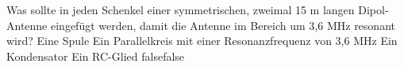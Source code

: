     {Was sollte in jeden Schenkel einer symmetrischen, zweimal 15 m langen Dipol-Antenne eingefügt werden, damit die Antenne im Bereich um 3,6 MHz resonant wird?}
    {Eine Spule}
    {Ein Parallelkreis mit einer Resonanzfrequenz von 3,6 MHz}
    {Ein Kondensator}
    {Ein RC-Glied}
    {false}{false}
